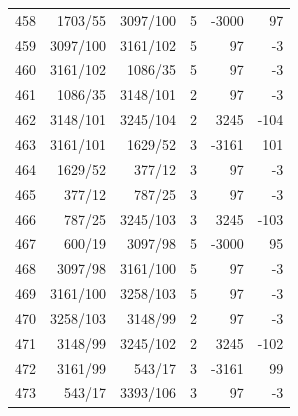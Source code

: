 \documentclass[11pt,a4paper]{article}
\begin{document}
\begin{minipage}[t]{.49\linewidth}
\begin{tabular*}{\linewidth}{@{}r@{\extracolsep{\fill}}rrrrr@{}}
458 & 1703/55 & 3097/100 & 5 & -3000 & 97\\
459 & 3097/100 & 3161/102 & 5 & 97 & -3\\
460 & 3161/102 & 1086/35 & 5 & 97 & -3\\
461 & 1086/35 & 3148/101 & 2 & 97 & -3\\
462 & 3148/101 & 3245/104 & 2 & 3245 & -104\\
463 & 3161/101 & 1629/52 & 3 & -3161 & 101\\
464 & 1629/52 & 377/12 & 3 & 97 & -3\\
465 & 377/12 & 787/25 & 3 & 97 & -3\\
466 & 787/25 & 3245/103 & 3 & 3245 & -103\\
467 & 600/19 & 3097/98 & 5 & -3000 & 95\\
468 & 3097/98 & 3161/100 & 5 & 97 & -3\\
469 & 3161/100 & 3258/103 & 5 & 97 & -3\\
470 & 3258/103 & 3148/99 & 2 & 97 & -3\\
471 & 3148/99 & 3245/102 & 2 & 3245 & -102\\
472 & 3161/99 & 543/17 & 3 & -3161 & 99\\
473 & 543/17 & 3393/106 & 3 & 97 & -3\\
\bottomrule\end{tabular*}\end{minipage}\hfill
\end{document}

